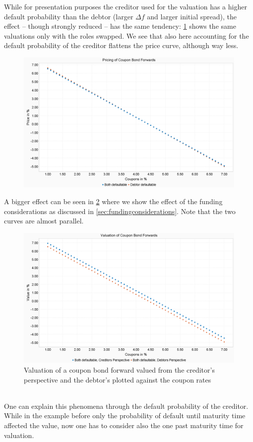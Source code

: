 \documentclass[12pt]{article}
\begin{document}
	While for presentation purposes the creditor used for the valuation has a higher default probability than the debtor (larger $\Delta f$ and larger initial spread), the effect -- though strongly reduced -- has the same tendency: \cref{fig:valuationcouponbondforwardbycouponsrightcred} shows the same valuations only with the roles swapped. We see that also here accounting for the default probability of the creditor flattens the price curve, although way less.
	\begin{figure}[!h]
		\centering
		\includegraphics[width=0.7\linewidth]{figures/Today/ValuationCouponBondForward_byCoupons_RightCred}
		\caption{}
		\label{fig:valuationcouponbondforwardbycouponsrightcred}
	\end{figure}	
	A bigger effect can be seen in \cref{fig:valuationcouponbondforwardbycoupons} where we show the effect of the funding considerations as discussed in \cref{sec:fundingconsiderations}. Note that the two curves are almost parallel.
	\begin{figure}[!h]
		\centering
		\includegraphics[width=0.7\linewidth]{figures/Today/ValuationCouponBondForward_byCoupons}
		\caption{Valuation of a coupon bond forward valued from the creditor's perspective and the debtor's plotted against the coupon rates}
		\label{fig:valuationcouponbondforwardbycoupons}
	\end{figure}
	\\One can explain this phenomena through the default probability of the creditor. While in the example before only the probability of default until maturity time affected the value, now one has to consider also the one past maturity time for valuation.
		
\end{document}
